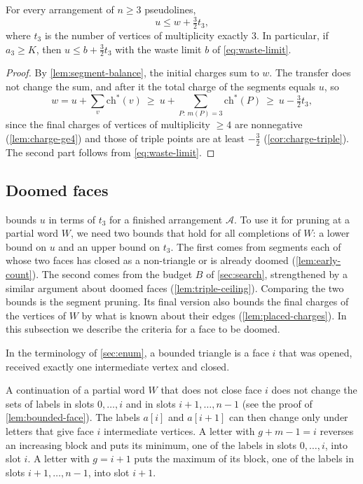 \begin{corollary}\label{cor:unused-bound}
For every arrangement of $n\ge3$ pseudolines,
\begin{equation}\label{eq:segm-bound}
u\le w+\tfrac32 t_3 ,
\end{equation}
where $t_3$ is the number of vertices of multiplicity exactly 3.
In particular, if $a_3\ge K$, then $u\le b+\tfrac32t_3$ with the waste limit $b$ of \eqref{eq:waste-limit}.
\end{corollary}

\begin{proof}
By \cref{lem:segment-balance}, the initial charges sum to $w$.
The transfer does not change the sum, and after it the total charge of the segments equals $u$, so
\[
w=u+\sum_v\mathrm{ch}^*(v)\ \ge\ u+\sum_{P:\,m(P)=3}\mathrm{ch}^*(P)\ \ge\ u-\tfrac32t_3 ,
\]
since the final charges of vertices of multiplicity $\ge4$ are nonnegative (\cref{lem:charge-ge4}) and those of triple points are at least $-\tfrac32$ (\cref{cor:charge-triple}).
The second part follows from \eqref{eq:waste-limit}.
\end{proof}

\subsection{Doomed faces}\label{app:doomed}

 bounds $u$ in terms of $t_3$ for a finished arrangement $\mathcal{A}$.
To use it for pruning at a partial word $W$, we need two bounds that hold for all completions of $W$: a lower bound on $u$ and an upper bound on $t_3$.
The first comes from segments each of whose two faces has closed as a non-triangle or is already doomed (\cref{lem:early-count}).
The second comes from the budget $B$ of \cref{sec:search}, strengthened by a similar argument about doomed faces (\cref{lem:triple-ceiling}).
Comparing the two bounds is the segment pruning.
Its final version also bounds the final charges of the vertices of $W$ by what is known about their edges (\cref{lem:placed-charges}).
In this subsection we describe the criteria for a face to be doomed.

In the terminology of \cref{sec:enum}, a bounded triangle is a face $i$ that was opened, received exactly one intermediate vertex and closed.

A continuation of a partial word $W$ that does not close face $i$ does not change the sets of labels in slots $0,\ldots,i$ and in slots $i+1,\ldots,n-1$ (see the proof of \cref{lem:bounded-face}).
The labels $a[i]$ and $a[i+1]$ can then change only under letters that give face $i$ intermediate vertices.
A letter with $g+m-1=i$ reverses an increasing block and puts its minimum, one of the labels in slots $0,\ldots,i$, into slot $i$. A letter with $g=i+1$ puts the maximum of its block, one of the labels in slots $i+1,\ldots,n-1$, into slot $i+1$.

